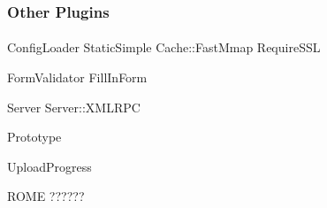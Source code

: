 \subsubsection{Other Plugins}

\paragraph{}
ConfigLoader
StaticSimple
Cache::FastMmap
               RequireSSL

                FormValidator
                FillInForm 

                Server 
                Server::XMLRPC

                Prototype
 
                UploadProgress

                ROME ??????